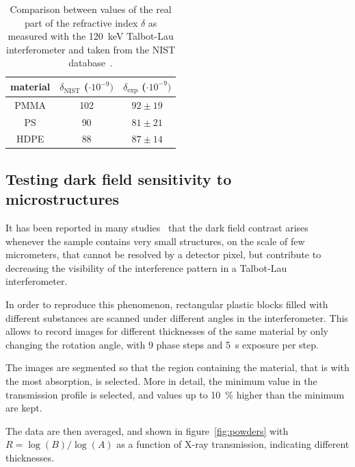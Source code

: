 \begin{table}[htb]
    \centering
    \begin{tabular}{*3c}
        \toprule
        material & $\delta_{\text{NIST}}$ ($\cdot 10^{-9})$ &
        $\delta_{\text{exp}}$ ($\cdot 10^{-9})$ \\
        \midrule
        PMMA & \num{102} & $92 \pm 19$\\
        PS & \num{90} & $81 \pm 21$\\
        HDPE & \num{88} & $87 \pm 14$\\
        \bottomrule
    \end{tabular}
    \caption{Comparison between values of the real part of the refractive
        index $\delta$ as measured with the \SI{120}{\kilo\eV} Talbot-Lau
        interferometer and taken from the NIST database~\parencite{nist}.}
    \label{tab:delta.experiment}
\end{table}

\subsection{Testing dark field sensitivity to microstructures}
It has been reported in many
studies~\parencite{Yashiro:10,Cong:12,Ritter:14,Schleede2012a,Meinel_2014,Scherer2015NoninvasiveDO}
that the dark field contrast arises whenever the sample contains very small
structures, on the scale of few
micrometers, that cannot be resolved by a detector pixel, but contribute to
decreasing the visibility of the interference pattern in a Talbot-Lau
interferometer.

In order to reproduce this phenomenon, rectangular plastic blocks filled
with different substances are scanned under different angles in the
interferometer. This allows to record images for different thicknesses of
the same material by only changing the rotation angle, with \num{9} phase
steps and \SI{5}{\second} exposure per step.

The images are segmented so that the region containing the material, that is
with the most absorption, is selected. More in detail, the minimum value in
the transmission profile is selected, and values up to
\SI{10}{\percent} higher than the minimum are kept.

The data are then averaged, and shown in figure~\ref{fig:powders} with $R =
\log(B) / \log(A)$ as a function of X-ray transmission, indicating different
thicknesses.

